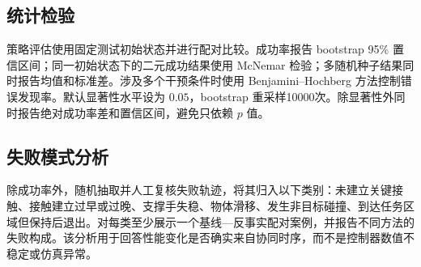 \subsection{统计检验}

策略评估使用固定测试初始状态并进行配对比较。成功率报告 bootstrap 95\% 置信区间；同一初始状态下的二元成功结果使用 McNemar 检验；多随机种子结果同时报告均值和标准差。涉及多个干预条件时使用 Benjamini--Hochberg 方法控制错误发现率。默认显著性水平设为 $0.05$，bootstrap 重采样10000次。除显著性外同时报告绝对成功率差和置信区间，避免只依赖 $p$ 值。

\subsection{失败模式分析}

除成功率外，随机抽取并人工复核失败轨迹，将其归入以下类别：未建立关键接触、接触建立过早或过晚、支撑手失稳、物体滑移、发生非目标碰撞、到达任务区域但保持后退出。对每类至少展示一个基线—反事实配对案例，并报告不同方法的失败构成。该分析用于回答性能变化是否确实来自协同时序，而不是控制器数值不稳定或仿真异常。

